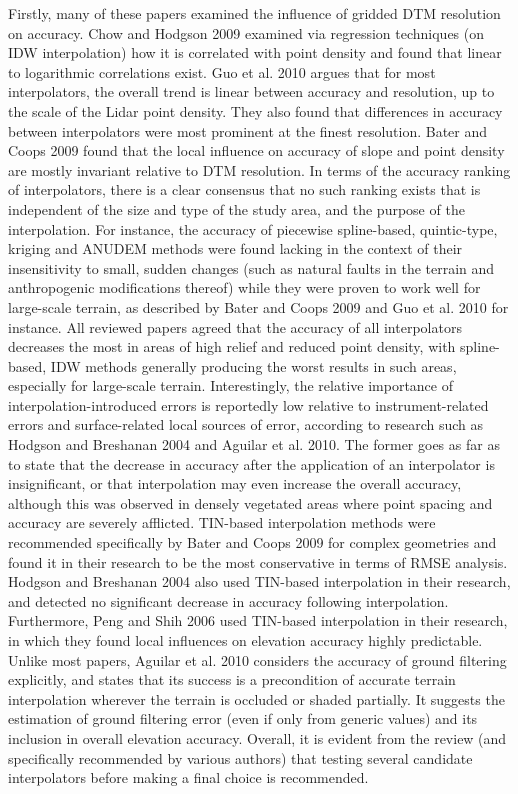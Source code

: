 Firstly, many of these papers examined the influence of gridded DTM resolution on accuracy. Chow and Hodgson 2009 examined via regression techniques (on IDW interpolation) how it is correlated with point density and found that linear to logarithmic correlations exist. Guo et al. 2010 argues that for most interpolators, the overall trend is linear between accuracy and resolution, up to the scale of the Lidar point density. They also found that differences in accuracy between interpolators were most prominent at the finest resolution. Bater and Coops 2009 found that the local influence on accuracy of slope and point density are mostly invariant relative to DTM resolution. In terms of the accuracy ranking of interpolators, there is a clear consensus that no such ranking exists that is independent of the size and type of the study area, and the purpose of the interpolation. For instance, the accuracy of piecewise spline-based, quintic-type, kriging and ANUDEM methods were found lacking in the context of their insensitivity to small, sudden changes (such as natural faults in the terrain and anthropogenic modifications thereof) while they were proven to work well for large-scale terrain, as described by Bater and Coops 2009 and Guo et al. 2010 for instance. All reviewed papers agreed that the accuracy of all interpolators decreases the most in areas of high relief and reduced point density, with spline-based, IDW methods generally producing the worst results in such areas, especially for large-scale terrain. Interestingly, the relative importance of interpolation-introduced errors is reportedly low relative to instrument-related errors and surface-related local sources of error, according to research such as Hodgson and Breshanan 2004 and Aguilar et al. 2010. The former goes as far as to state that the decrease in accuracy after the application of an interpolator is insignificant, or that interpolation may even increase the overall accuracy, although this was observed in densely vegetated areas where point spacing and accuracy are severely afflicted. TIN-based interpolation methods were recommended specifically by Bater and Coops 2009 for complex geometries and found it in their research to be the most conservative in terms of RMSE analysis. Hodgson and Breshanan 2004 also used TIN-based interpolation in their research, and detected no significant decrease in accuracy following interpolation. Furthermore, Peng and Shih 2006 used TIN-based interpolation in their research, in which they found local influences on elevation accuracy highly predictable. Unlike most papers, Aguilar et al. 2010 considers the accuracy of ground filtering explicitly, and states that its success is a precondition of accurate terrain interpolation wherever the terrain is occluded or shaded partially. It suggests the estimation of ground filtering error (even if only from generic values) and its inclusion in overall elevation accuracy. Overall, it is evident from the review (and specifically recommended by various authors) that testing several candidate interpolators before making a final choice is recommended.

